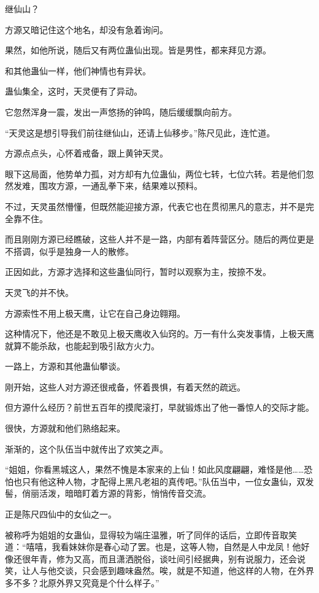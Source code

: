 \begin{this_body}
继仙山？

方源又暗记住这个地名，却没有急着询问。

果然，如他所说，随后又有两位蛊仙出现。皆是男性，都来拜见方源。

和其他蛊仙一样，他们神情也有异状。

蛊仙集全，这时，天灵便有了异动。

它忽然浑身一震，发出一声悠扬的钟鸣，随后缓缓飘向前方。

“天灵这是想引导我们前往继仙山，还请上仙移步。”陈尺见此，连忙道。

方源点点头，心怀着戒备，跟上黄钟天灵。

眼下这局面，他势单力孤，对方却有九位蛊仙，两位七转，七位六转。若是他们忽然发难，围攻方源，一通乱拳下来，结果难以预料。

不过，天灵虽然懵懂，但既然能迎接方源，代表它也在贯彻黑凡的意志，并不是完全靠不住。

而且刚刚方源已经瞧破，这些人并不是一路，内部有着阵营区分。随后的两位更是不搭调，似乎是独身一人的散修。

正因如此，方源才选择和这些蛊仙同行，暂时以观察为主，按捺不发。

天灵飞的并不快。

方源索性不用上极天鹰，让它在自己身边翱翔。

这种情况下，他还是不敢见上极天鹰收入仙窍的。万一有什么突发事情，上极天鹰就算不能杀敌，也能起到吸引敌方火力。

一路上，方源和其他蛊仙攀谈。

刚开始，这些人对方源还很戒备，怀着畏惧，有着天然的疏远。

但方源什么经历？前世五百年的摸爬滚打，早就锻炼出了他一番惊人的交际才能。

很快，方源就和他们熟络起来。

渐渐的，这个队伍当中就传出了欢笑之声。

“姐姐，你看黑城这人，果然不愧是本家来的上仙！如此风度翩翩，难怪是他……恐怕也只有他这种人物，才配得上黑凡老祖的真传吧。”队伍当中，一位女蛊仙，双发髻，俏丽活泼，暗暗盯着方源的背影，悄悄传音交流。

正是陈尺四仙中的女仙之一。

被称呼为姐姐的女蛊仙，显得较为端庄温雅，听了同伴的话后，立即传音取笑道：“嘻嘻，我看妹妹你是春心动了罢。也是，这等人物，自然是人中龙凤！他好像还很年青，修为又高，而且潇洒脱俗，谈吐间引经据典，别有说服力，还会说笑，让人与他交谈，只会感到趣味盎然。唉，就是不知道，他这样的人物，在外界多不多？北原外界又究竟是个什么样子。”


\end{this_body}

